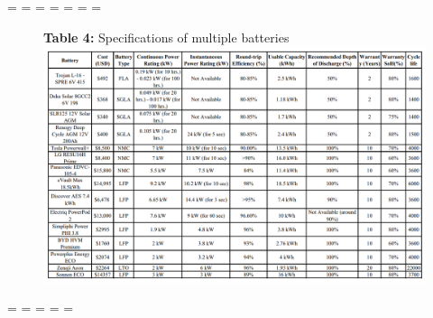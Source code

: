 \paperwidth=\pdfpageheight
\paperheight=\pdfpagewidth
\pdfpageheight=\paperheight
\pdfpagewidth=\paperwidth
\headwidth=\textheight
\begingroup 
\vsize=\textwidth
\hsize=\textheight
\begin{figure}[H]
    \centering
    \textbf{Table 4:} Specifications of multiple batteries
    \includegraphics[scale=1.25]{src/aa.png}
\end{figure}

\endgroup
\newpage
\paperwidth=\pdfpageheight
\paperheight=\pdfpagewidth
\pdfpageheight=\paperheight
\pdfpagewidth=\paperwidth
\headwidth=\textwidth

